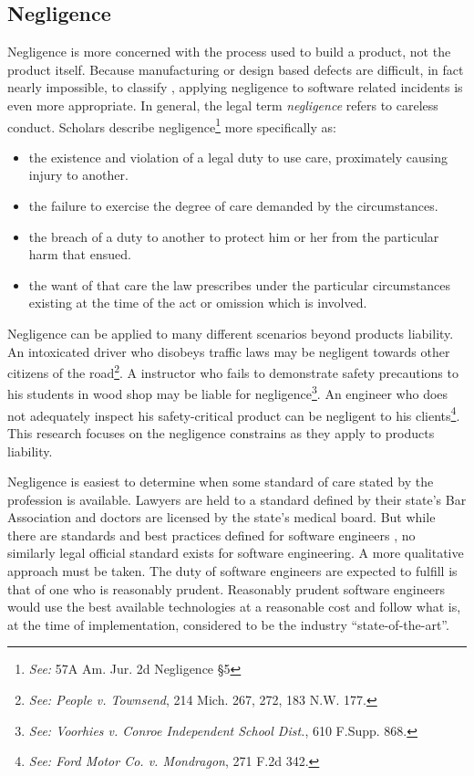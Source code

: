 \documentclass[12pt]{report}
\begin{document}
\subsection{Negligence}

Negligence is more concerned with the process used to build a product, not the product itself. Because manufacturing or design based defects are difficult, in fact nearly impossible, to classify \cite{Turner99}, applying negligence to software related incidents is even more appropriate. In general, the legal term \textit{negligence} refers to careless conduct. Scholars describe negligence\footnote{\textit{See:} 57A Am. Jur. 2d Negligence \S 5} more specifically as:\singlespace
\begin{itemize}
 \item the existence and violation of a legal duty to use care, proximately 
 causing injury to another.
 \item the failure to exercise the degree of care demanded by the circumstances.
 \item the breach of a duty to another to protect him or her from the particular
 harm that ensued.
 \item the want of that care the law prescribes under the particular
 circumstances existing at the time of the act or omission which is involved.
\end{itemize}\doublespace
Negligence can be applied to many different scenarios beyond products liability. An intoxicated driver who disobeys traffic laws may be negligent towards other citizens of the road\footnote{\textit{See: People v. Townsend}, 214 Mich. 267, 272, 183 N.W. 177.}. A instructor who fails to demonstrate safety precautions to his students in wood shop may be liable for negligence\footnote{\textit{See: Voorhies v. Conroe Independent School Dist.}, 610 F.Supp. 868.}. An engineer who does not adequately inspect his safety-critical product can be negligent to his clients\footnote{\textit{See: Ford Motor Co. v. Mondragon}, 271 F.2d 342.}. This research focuses on the negligence constrains as they apply to products liability.

Negligence is easiest to determine when some standard of care stated by the profession is available. Lawyers are held to a standard defined by their state's Bar Association and doctors are licensed by the state's medical board. But while there are standards and best practices defined for software engineers \cite{FAKE}, no similarly legal official standard exists for software engineering. A more qualitative approach must be taken. The duty of software engineers are expected to fulfill is that of one who is reasonably prudent. Reasonably prudent software engineers would use the best available technologies at a reasonable cost and follow what is, at the time of implementation, considered to be the industry ``state-of-the-art''.
\end{document}
